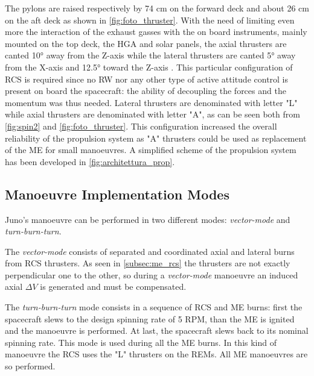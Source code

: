 

The pylons are raised respectively by 74 cm on the forward deck and about 26 cm on the aft deck as shown in \autoref{fig:foto_thruster}.
 With the need of limiting even more the interaction of the exhaust gasses with the on board instruments, mainly mounted on the top deck, the HGA and solar panels, the axial thrusters are canted 10° away from the Z-axis while the lateral thrusters are canted 5° away from the X-axis and 12.5° toward the Z-axis \cite{juno_inner}. This particular configuration of RCS is required since no RW nor any other type of active attitude control is present on board the spacecraft: the ability of decoupling the forces and the momentum was thus needed.
Lateral thrusters are denominated with letter "L" while axial thrusters are denominated with letter "A", as can be seen both from \autoref{fig:spin2} and \autoref{fig:foto_thruster}. This configuration increased the overall reliability of the propulsion system as "A" thrusters could be used as replacement of the ME for small manoeuvres. A simplified scheme of the propulsion system has been developed in \autoref{fig:architettura_prop}.

\subsection{Manoeuvre Implementation Modes}
\label{subsec:manoeuvre_implemementation_modes}

Juno's manoeuvre can be performed in two different modes: \textit{vector-mode} and \textit{turn-burn-turn}.

The \textit{vector-mode} consists of separated and coordinated axial and lateral burns from RCS thrusters. As seen in \autoref{subsec:me_rcs} the thrusters are not exactly perpendicular one to the other, so during a \textit{vector-mode} manoeuvre an induced axial $\Delta V$ is generated and must be compensated.

The \textit{turn-burn-turn} mode consists in a sequence of RCS and ME burns: first the spacecraft slews to the design spinning rate of 5 RPM, than the ME is ignited and the manoeuvre is performed. At last, the spacecraft slews back to its nominal spinning rate. This mode is used during all the ME burns. In this kind of manoeuvre the RCS uses the "L" thrusters on the REMs. All ME manoeuvres are so performed.

